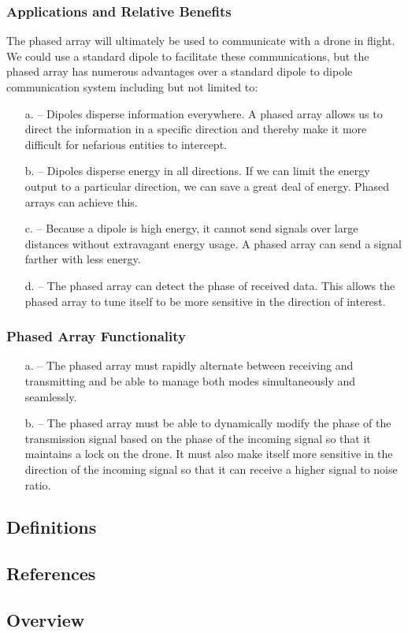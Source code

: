 \documentclass[ProjectRequirements.tex]{subfiles}
\begin{document}
		\subsubsection{Applications and Relative Benefits}
			The phased array will ultimately be used to communicate with a drone in flight. We could use a standard dipole to facilitate these communications, but the phased array has numerous advantages over a standard dipole to dipole communication system including but not limited to:
			\begin{itemize} \itemsep1pt
				\item[a.]	 -- Dipoles disperse information everywhere. A phased array allows us to direct the information in a specific direction and thereby make it more difficult for nefarious entities to intercept.
				\item[b.] 	 -- Dipoles disperse energy in all directions. If we can limit the energy output to a particular direction, we can save a great deal of energy. Phased arrays can achieve this.
				\item[c.] 	 -- Because a dipole is high energy, it cannot send signals over large distances without extravagant energy usage. A phased array can send a signal farther with less energy.
 				\item[d.] 	 -- The phased array can detect the phase of received data. This allows the phased array to tune itself to be more sensitive in the direction of interest.
			\end{itemize}
		\subsubsection{Phased Array Functionality}
			\begin{itemize} \itemsep-1pt
				\item[a.]	 -- The phased array must rapidly alternate between receiving and transmitting and be able to manage both modes simultaneously and seamlessly.
				\item[b.] 	 -- The phased array must be able to dynamically modify the phase of the transmission signal based on the phase of the incoming signal so that it maintains a lock on the drone. It must also make itself more sensitive in the direction of the incoming signal so that it can receive a higher signal to noise ratio.
			\end{itemize}
	\subsection{Definitions}
	\subsection{References}
	\subsection{Overview}
\end{document}
